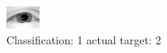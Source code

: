 \begin{figure}[h!]
\begin{center}
\includegraphics[width=0.60\columnwidth]{figures/ID2306_class_1_target_2.png}
\end{center}
\caption{ Classification: 1 actual target: 2}
\label{fig:ID2306_class_1_target_2}
\end{figure}
